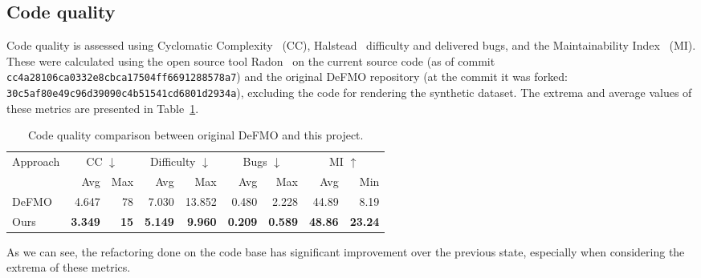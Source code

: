 \subsection{Code quality}
    Code quality is assessed using Cyclomatic Complexity~\citep{mccabe} (CC), Halstead~\citep{halstead} difficulty and delivered bugs, and the Maintainability Index~\citep{mi-original,mi-revision} (MI).
    These were calculated using the open source tool Radon~\citep{radon} on the current source code (as of commit \texttt{cc4a28106ca0332e8cbca17504ff6691288578a7}) and the original DeFMO repository (at the commit it was forked: \texttt{30c5af80e49c96d39090c4b51541cd6801d2934a}), excluding the code for rendering the synthetic dataset.
    The extrema and average values of these metrics are presented in Table~\ref{tab:radon}.

    \begin{table}
        \caption{Code quality comparison between original DeFMO and this project.}%
        \label{tab:radon}
        \centering
        \begin{tabular}{lrrrrrrrr}
            \toprule
            \multirow{2}[2]{*}{Approach} & \multicolumn{2}{c}{CC $\downarrow$} & \multicolumn{2}{c}{Difficulty $\downarrow$} & \multicolumn{2}{c}{Bugs $\downarrow$} & \multicolumn{2}{c}{MI $\uparrow$}\\
            \cmidrule(lr){2-3} \cmidrule(lr){4-5} \cmidrule(lr){6-7} \cmidrule(lr){8-9}
            & Avg & Max & Avg & Max & Avg & Max & Avg & Min\\
            \midrule
            DeFMO & 4.647 & 78 & 7.030 & 13.852 & 0.480 & 2.228 & 44.89 & 8.19\\
            Ours & \textbf{3.349} & \textbf{15} & \textbf{5.149} & \textbf{9.960} & \textbf{0.209} & \textbf{0.589} & \textbf{48.86} & \textbf{23.24}\\
            \bottomrule
        \end{tabular}
    \end{table}

    As we can see, the refactoring done on the code base has significant improvement over the previous state, especially when considering the extrema of these metrics.
